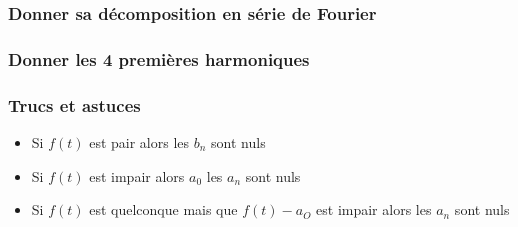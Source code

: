 \documentclass[12pt, a4paper]{article}
\begin{document}
\subsubsection{Donner sa décomposition en série de Fourier}

\subsubsection{Donner les 4 premières harmoniques}

\subsubsection{Trucs et astuces}

\begin{itemize}
    \item Si $ f(t) $ est pair alors les $ b_{n} $ sont nuls
    \item Si $ f(t) $ est impair alors $ a_{0} $ les $ a_{n} $ sont nuls
    \item Si $ f(t) $ est quelconque mais que $ f(t) - a_{O} $ est impair alors les
    $ a_{n} $ sont nuls 
\end{itemize}
\end{document}
